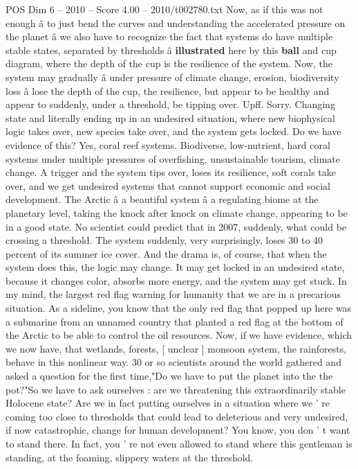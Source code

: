 \begin{textsample}{POS Dim 6 – 2010 – Score 4.00 – 2010/t002780.txt}
Now, as if this was not enough â to just bend the curves and understanding the accelerated pressure on the planet â we also have to recognize the fact that systems do have multiple stable states, separated by thresholds â \textbf{illustrated} here by this \textbf{ball} and cup diagram, where the depth of the cup is the resilience of the system.
Now, the system may gradually â under pressure of climate change, erosion, biodiversity loss â lose the depth of the cup, the resilience, but appear to be healthy and appear to suddenly, under a threshold, be tipping over.
Upff.
Sorry.
Changing state and literally ending up in an undesired situation, where new biophysical logic takes over, new species take over, and the system gets locked.
Do we have evidence of this?
Yes, coral reef systems.
Biodiverse, low-nutrient, hard coral systems under multiple pressures of overfishing, unsustainable tourism, climate change.
A trigger and the system tips over, loses its resilience, soft corals take over, and we get undesired systems that cannot support economic and social development.
The Arctic â a beautiful system â a regulating biome at the planetary level, taking the knock after knock on climate change, appearing to be in a good state.
No scientist could predict that in 2007, suddenly, what could be crossing a threshold.
The system suddenly, very surprisingly, loses 30 to 40 percent of its summer ice cover.
And the drama is, of course, that when the system does this, the logic may change.
It may get locked in an undesired state, because it changes color, absorbs more energy, and the system may get stuck.
In my mind, the largest red flag warning for humanity that we are in a precarious situation.
As a sideline, you know that the only red flag that popped up here was a submarine from an unnamed country that planted a red flag at the bottom of the Arctic to be able to control the oil resources.
Now, if we have evidence, which we now have, that wetlands, forests, [ unclear ] monsoon system, the rainforests, behave in this nonlinear way. 30 or so scientists around the world gathered and asked a question for the first time,"Do we have to put the planet into the the pot?"So we have to ask ourselves : are we threatening this extraordinarily stable Holocene state?
Are we in fact putting ourselves in a situation where we ' re coming too close to thresholds that could lead to deleterious and very undesired, if now catastrophic, change for human development?
You know, you don ' t want to stand there.
In fact, you ' re not even allowed to stand where this gentleman is standing, at the foaming, slippery waters at the threshold.

\end{textsample}
